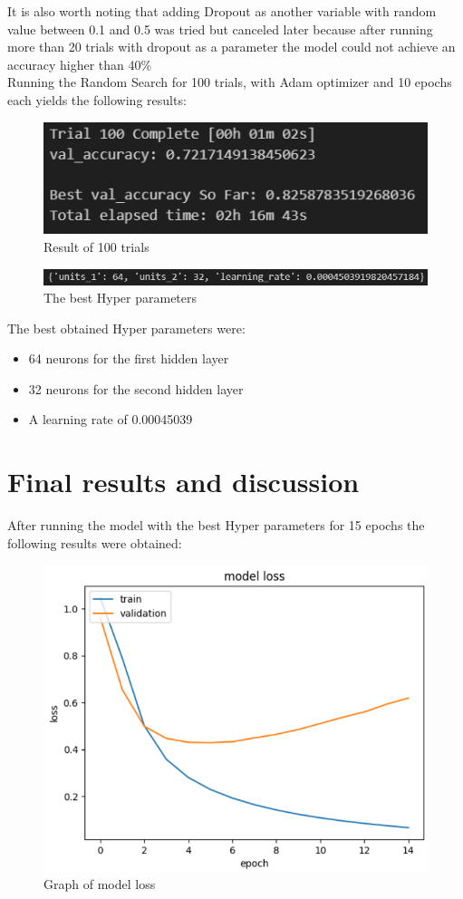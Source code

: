 \documentclass[12pt, a4paper]{article}
\begin{document}
It is also worth noting that adding Dropout as another variable with random value between 0.1 and 0.5 was tried but canceled later because after running more than 20 trials with dropout as a parameter the model could not achieve an accuracy higher than 40\% \\

Running the Random Search for 100 trials, with Adam optimizer and 10 epochs each yields the following results: 

\begin{figure}[H]
    \centering
    \includegraphics[width=0.5\linewidth]{search.png}
    \caption{Result of 100 trials}
    \label{fig:enter-label}
\end{figure}

\begin{figure}[H]
    \centering
    \includegraphics[width=0.5\linewidth]{hp.png}
    \caption{The best Hyper parameters}
    \label{fig:enter-label}
\end{figure}

The best obtained Hyper parameters were: 
\begin{itemize}
    \item 64 neurons for the first hidden layer
    \item 32 neurons for the second hidden layer
    \item A learning rate of 0.00045039 \\
\end{itemize}

\section{Final results and discussion}
After running the model with the best Hyper parameters for 15 epochs the following results were obtained:

\begin{figure}[H]
    \centering
    \includegraphics[width=0.5\linewidth]{loss.png}
    \caption{Graph of model loss}
    \label{fig:enter-label}
\end{figure}
\end{document}
